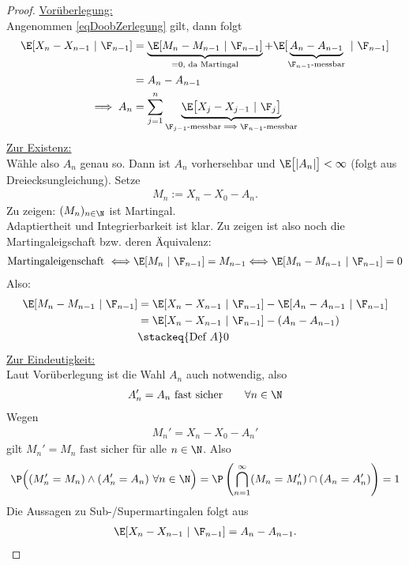 \begin{proof}
\underline{Vorüberlegung:}\\
Angenommen \eqref{eqDoobZerlegung} gilt, dann folgt
\begin{align*}
\E[X_n-X_{n-1}~|~\F_{n-1}]
&=\underbrace{\E[M_n-M_{n-1}~|~\F_{n-1}]}_{=0\text{, da Martingal}}
+\E[\underbrace{A_n-A_{n-1}}_{\F_{n-1}\text{-messbar}}~|~\F_{n-1}]\\
&=A_n-A_{n-1}\\
\implies
A_n&=\sum\limits_{j=1}^n\underbrace{\E\big[X_j-X_{j-1}~|~\F_j\big]}_{\F_{j-1}\text{-messbar}\implies\F_{n-1}\text{-messbar}}
\end{align*}
\underline{Zur Existenz:}\\
Wähle also $A_n$ genau so. Dann ist $A_n$ vorhersehbar und $\E\big[|A_n|\big]<\infty$ (folgt aus Dreiecksungleichung). Setze
\begin{align*}
M_n:=X_n-X_0-A_n.
\end{align*}
Zu zeigen: $(M_n)_{n\in\N}$ ist Martingal.\\
Adaptiertheit und Integrierbarkeit ist klar. Zu zeigen ist also noch die Martingaleigschaft bzw. deren Äquivalenz:
\begin{align*}
\text{Martingaleigenschaft }\Longleftrightarrow
\E[M_n~|~\F_{n-1}]=M_{n-1}\Longleftrightarrow
\E[M_n-M_{n-1}~|~\F_{n-1}]=0
\end{align*}
Also:
\begin{align*}
\E[M_{n}-M_{n-1}~|~\F_{n-1}]
&=\E[ X_n-X_{n-1}~|~\F_{n-1}]
-\E[A_n-A_{n-1}~|~\F_{n-1}]\\
&=\E[ X_n-X_{n-1}~|~\F_{n-1}]
-(A_n-A_{n-1})\\
&\stackeq{\text{Def }A}
0
\end{align*}
\underline{Zur Eindeutigkeit:}\\
Laut Vorüberlegung ist die Wahl $A_n$ auch notwendig, also 
\begin{align*}
A_n'=A_n\text{ fast sicher}\qquad\forall n\in\N
\end{align*}
Wegen
\begin{align*}
M_n'=X_n-X_0-A_n'
\end{align*}
gilt
$M_n'=M_n\text{ fast sicher}$ für alle $n\in\N$. Also
\begin{align*}
\P\Big((M_n'=M_n)\wedge(A_n'=A_n)~\forall n\in\N\Big)
=\P\left(\bigcap\limits_{n=1}^\infty(M_n=M_n')\cap(A_n=A_n')\right)
=1
\end{align*}
Die Aussagen zu Sub-/Supermartingalen folgt aus
\begin{align*}
\E[X_n-X_{n-1}~|~\F_{n-1}]=A_n-A_{n-1}.
\end{align*}
\end{proof}

